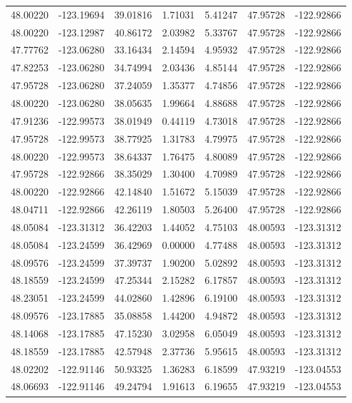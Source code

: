 \documentclass[draft]{agujournal2019}
\begin{document}
\begin{center}
\begin{longtable}{c c c c c c c}
48.00220 & -123.19694 & 39.01816 & 1.71031 & 5.41247 & 47.95728 & -122.92866 \\
48.00220 & -123.12987 & 40.86172 & 2.03982 & 5.33767 & 47.95728 & -122.92866 \\
47.77762 & -123.06280 & 33.16434 & 2.14594 & 4.95932 & 47.95728 & -122.92866 \\
47.82253 & -123.06280 & 34.74994 & 2.03436 & 4.85144 & 47.95728 & -122.92866 \\
47.95728 & -123.06280 & 37.24059 & 1.35377 & 4.74856 & 47.95728 & -122.92866 \\
48.00220 & -123.06280 & 38.05635 & 1.99664 & 4.88688 & 47.95728 & -122.92866 \\
47.91236 & -122.99573 & 38.01949 & 0.44119 & 4.73018 & 47.95728 & -122.92866 \\
47.95728 & -122.99573 & 38.77925 & 1.31783 & 4.79975 & 47.95728 & -122.92866 \\
48.00220 & -122.99573 & 38.64337 & 1.76475 & 4.80089 & 47.95728 & -122.92866 \\
47.95728 & -122.92866 & 38.35029 & 1.30400 & 4.70989 & 47.95728 & -122.92866 \\
48.00220 & -122.92866 & 42.14840 & 1.51672 & 5.15039 & 47.95728 & -122.92866 \\
48.04711 & -122.92866 & 42.26119 & 1.80503 & 5.26400 & 47.95728 & -122.92866 \\
48.05084 & -123.31312 & 36.42203 & 1.44052 & 4.75103 & 48.00593 & -123.31312 \\
48.05084 & -123.24599 & 36.42969 & 0.00000 & 4.77488 & 48.00593 & -123.31312 \\
48.09576 & -123.24599 & 37.39737 & 1.90200 & 5.02892 & 48.00593 & -123.31312 \\
48.18559 & -123.24599 & 47.25344 & 2.15282 & 6.17857 & 48.00593 & -123.31312 \\
48.23051 & -123.24599 & 44.02860 & 1.42896 & 6.19100 & 48.00593 & -123.31312 \\
48.09576 & -123.17885 & 35.08858 & 1.44200 & 4.94872 & 48.00593 & -123.31312 \\
48.14068 & -123.17885 & 47.15230 & 3.02958 & 6.05049 & 48.00593 & -123.31312 \\
48.18559 & -123.17885 & 42.57948 & 2.37736 & 5.95615 & 48.00593 & -123.31312 \\
48.02202 & -122.91146 & 50.93325 & 1.36283 & 6.18599 & 47.93219 & -123.04553 \\
48.06693 & -122.91146 & 49.24794 & 1.91613 & 6.19655 & 47.93219 & -123.04553 \\

\end{longtable}
\end{center}
\end{document}
